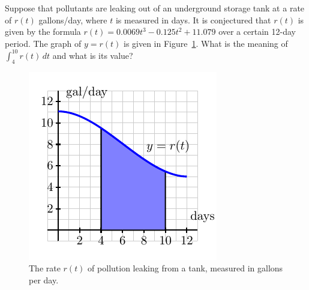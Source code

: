 \begin{example} \label{Ex:4.4.1}
Suppose that pollutants are leaking out of an underground storage tank at a rate of $r(t)$ gallons/day, where $t$ is measured in days.  It is conjectured that $r(t)$ is given by the formula $r(t) = 0.0069t^3 -0.125t^2+11.079$ over a certain 12-day period.  The graph of $y=r(t)$ is given in Figure~\ref{F:4.4.TCTEx}.  What is the meaning of $\int_4^{10} r(t) \, dt$ and what is its value?  
\begin{figure}[h]
\begin{center}
\includegraphics{figures/4_4_TCTEx}
\caption{The rate $r(t)$ of pollution leaking from a tank, measured in gallons per day.} \label{F:4.4.TCTEx}
\end{center}
\end{figure}
\end{example}
